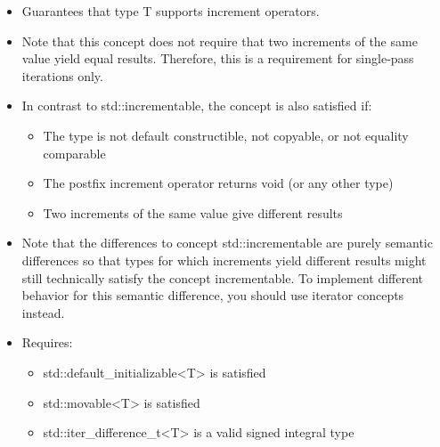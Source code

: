 

\begin{itemize}
\item
Guarantees that type T supports increment operators.

\item
Note that this concept does not require that two increments of the same value yield equal results. Therefore, this is a requirement for single-pass iterations only.

\item
In contrast to std::incrementable, the concept is also satisfied if:

\begin{itemize}
\item
The type is not default constructible, not copyable, or not equality comparable

\item
The postfix increment operator returns void (or any other type)

\item
Two increments of the same value give different results
\end{itemize}

\item
Note that the differences to concept std::incrementable are purely semantic differences so that types for which increments yield different results might still technically satisfy the concept incrementable. To implement different behavior for this semantic difference, you should use iterator concepts instead.

\item
Requires:
\begin{itemize}
\item
std::default\_initializable<T> is satisfied

\item
std::movable<T> is satisfied

\item
std::iter\_difference\_t<T> is a valid signed integral type
\end{itemize}
\end{itemize}


